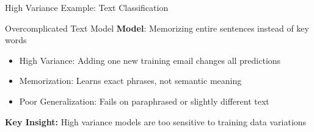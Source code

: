 \documentclass{beamer}
\begin{document}
\begin{frame}{High Variance Example: Text Classification}
\begin{examplebox}{Overcomplicated Text Model}
\textbf{Model}: Memorizing entire sentences instead of key words
\begin{itemize}
\item High Variance: Adding one new training email changes all predictions
\item Memorization: Learns exact phrases, not semantic meaning
\item Poor Generalization: Fails on paraphrased or slightly different text
\end{itemize}
\end{examplebox}

\begin{keypointsbox}
\textbf{Key Insight:} High variance models are too sensitive to training data variations
\end{keypointsbox}
\end{frame}
\end{document}
